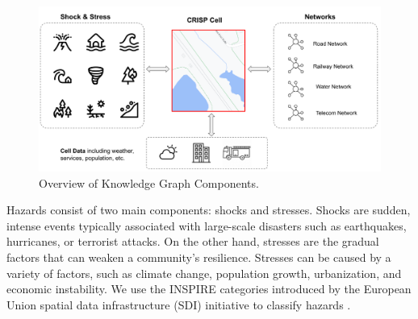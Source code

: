 \documentclass[
]{ceurart}
\begin{document}
\begin{figure}
  \label{overview}
  \centering
  \includegraphics[width=\linewidth]{images/Crisp_Overview}
  \caption{Overview of Knowledge Graph Components.}
\end{figure}


Hazards consist of two main components: shocks and stresses. Shocks are sudden, intense events typically associated with large-scale disasters such as earthquakes, hurricanes, or terrorist attacks. On the other hand, stresses are the gradual factors that can weaken a community's resilience. Stresses can be caused by a variety of factors, such as climate change, population growth, urbanization, and economic instability. We use the INSPIRE categories introduced by the European Union spatial data infrastructure (SDI) initiative to classify hazards \cite{bartha2011standardization}. 
\end{document}
